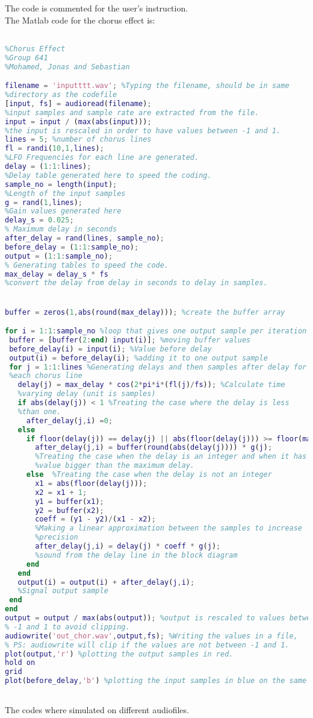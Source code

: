 The code is commented for the user's instruction.\\

The Matlab code for the chorus effect is:

\begin{lstlisting}[language=Matlab, caption= Matlab code for chorus effect]

%Chorus Effect
%Group 641
%Mohamed, Jonas and Sebastian

filename = 'inputttt.wav'; %Typing the filename, should be in same 
%directory as the codefile
[input, fs] = audioread(filename);
%input samples and sample rate are extracted from the file.
input = input / (max(abs(input)));
%the input is rescaled in order to have values between -1 and 1.
lines = 5; %number of chorus lines 
fl = randi(10,1,lines);
%LFO Frequencies for each line are generated.
delay = (1:1:lines);
%Delay table generated here to speed the coding. 
sample_no = length(input); 
%Length of the input samples
g = rand(1,lines); 
%Gain values generated here
delay_s = 0.025; 
% Maximum delay in seconds 
after_delay = rand(lines, sample_no); 
before_delay = (1:1:sample_no);
output = (1:1:sample_no);
% Generating tables to speed the code. 
max_delay = delay_s * fs  
%convert the delay from delay in seconds to delay in samples. 


buffer = zeros(1,abs(round(max_delay))); %create the buffer array 

for i = 1:1:sample_no %loop that gives one output sample per iteration
 buffer = [buffer(2:end) input(i)]; %moving buffer values
 before_delay(i) = input(i); %Value before delay
 output(i) = before_delay(i); %adding it to one output sample
 for j = 1:1:lines %Generating delays and then samples after delay for 
 %each chorus line
   delay(j) = max_delay * cos(2*pi*i*(fl(j)/fs)); %Calculate time  
   %varying delay (unit is samples)
   if abs(delay(j)) < 1 %Treating the case where the delay is less 
   %than one.
	 after_delay(j,i) =0;
   else
	 if floor(delay(j)) == delay(j) || abs(floor(delay(j))) >= floor(max_delay)
	   after_delay(j,i) = buffer(round(abs(delay(j)))) * g(j);
	   %Treating the case when the delay is an integer and when it has a
	   %value bigger than the maximum delay. 
	 else  %Treating the case when the delay is not an integer
	   x1 = abs(floor(delay(j)));
	   x2 = x1 + 1;
	   y1 = buffer(x1);
	   y2 = buffer(x2);
	   coeff = (y1 - y2)/(x1 - x2);
	   %Making a linear approximation between the samples to increase
	   %precision
	   after_delay(j,i) = delay(j) * coeff * g(j);  
	   %sound from the delay line in the block diagram
	 end
   end
   output(i) = output(i) + after_delay(j,i);
   %Signal output sample
 end
end
output = output / max(abs(output)); %output is rescaled to values between
% -1 and 1 to avoid clipping. 
audiowrite('out_chor.wav',output,fs); %Writing the values in a file, 
% PS: audiowrite will clip if the values are not between -1 and 1.
plot(output,'r') %plotting the output samples in red.
hold on
grid
plot(before_delay,'b') %plotting the input samples in blue on the same fig.



\end{lstlisting}

The codes where simulated on different audiofiles. 